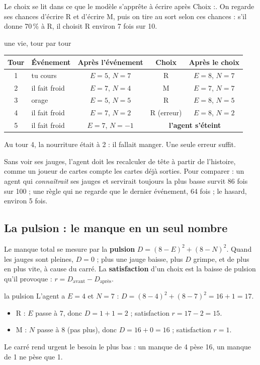 \documentclass[fontsize=10pt,paper=a4,parskip=half-]{scrartcl}
\newcommand{\q}[1]{\og #1\fg{}}
\newcommand{\pc}{\,\%}
\begin{document}
Le choix se lit dans ce que le modèle s'apprête à écrire après \q{Choix :}. On regarde
ses chances d'écrire \q{R} et d'écrire \q{M}, puis on tire au sort selon ces chances : s'il
donne 70\pc{} à R, il choisit R environ 7 fois sur 10.

\begin{calcul}{une vie, tour par tour}
\begin{center}\small
\begin{tabular}{clccc}
\toprule
Tour & Événement & Après l'événement & Choix & Après le choix\\
\midrule
1 & tu cours & $E=5$, $N=7$ & R & $E=8$, $N=7$\\
2 & il fait froid & $E=7$, $N=4$ & M & $E=7$, $N=7$\\
3 & orage & $E=5$, $N=5$ & R & $E=8$, $N=5$\\
4 & il fait froid & $E=7$, $N=2$ & R (erreur) & $E=8$, $N=2$\\
5 & il fait froid & $E=7$, $N=-1$ & \multicolumn{2}{c}{\textbf{l'agent s'éteint}}\\
\bottomrule
\end{tabular}
\end{center}
Au tour 4, la nourriture était à 2 : il fallait manger. Une seule erreur suffit.
\end{calcul}

Sans voir ses jauges, l'agent doit les recalculer \q{de tête} à partir de l'histoire,
comme un joueur de cartes compte les cartes déjà sorties. Pour comparer : un agent qui
\emph{connaîtrait} ses jauges et servirait toujours la plus basse survit 86 fois sur
100 ; une règle qui ne regarde que le dernier événement, 64 fois ; le hasard, environ 5 fois.

\subsection{La pulsion : le manque en un seul nombre}
Le manque total se mesure par la \textbf{pulsion} $D = (8-E)^2 + (8-N)^2$. Quand les
jauges sont pleines, $D=0$ ; plus une jauge baisse, plus $D$ grimpe, et de plus en plus
vite, à cause du carré. La \textbf{satisfaction} d'un choix est la baisse de pulsion qu'il
provoque : $r = D_{\text{avant}} - D_{\text{après}}$.

\begin{calcul}{la pulsion}
L'agent a $E=4$ et $N=7$ : $D = (8-4)^2 + (8-7)^2 = 16 + 1 = 17$.
\begin{itemize}
  \item R : $E$ passe à 7, donc $D = 1 + 1 = 2$ ; satisfaction $r = 17 - 2 = 15$.
  \item M : $N$ passe à 8 (pas plus), donc $D = 16 + 0 = 16$ ; satisfaction $r = 1$.
\end{itemize}
Le carré rend urgent le besoin le plus bas : un manque de 4 \q{pèse} 16, un manque de 1
ne pèse que 1.
\end{calcul}
\end{document}
